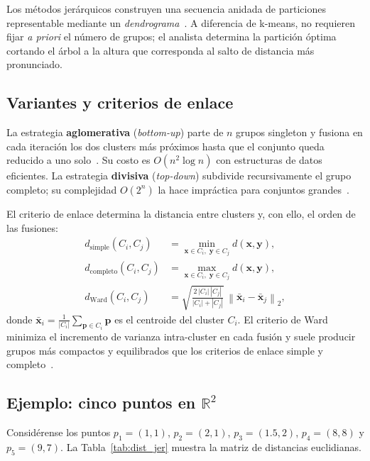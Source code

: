 Los métodos jerárquicos construyen una secuencia anidada de particiones representable mediante un \emph{dendrograma}~\cite{jain1999clustering}. A diferencia de k-means, no requieren fijar \textit{a priori} el número de grupos; el analista determina la partición óptima cortando el árbol a la altura que corresponda al salto de distancia más pronunciado.

\subsection{Variantes y criterios de enlace}

La estrategia \textbf{aglomerativa} (\textit{bottom-up}) parte de $n$ grupos singleton y fusiona en cada iteración los dos clusters más próximos hasta que el conjunto queda reducido a uno solo~\cite{murtagh2012hierarchical}. Su costo es $O(n^2 \log n)$ con estructuras de datos eficientes. La estrategia \textbf{divisiva} (\textit{top-down}) subdivide recursivamente el grupo completo; su complejidad $O(2^n)$ la hace impráctica para conjuntos grandes~\cite{jain1999clustering}.

El criterio de enlace determina la distancia entre clusters y, con ello, el orden de las fusiones:
\begin{align}
d_{\mathrm{simple}}(C_i, C_j) &= \min_{\mathbf{x}\in C_i,\;\mathbf{y}\in C_j} d(\mathbf{x},\mathbf{y}), \label{eq:single_link}\\
d_{\mathrm{completo}}(C_i, C_j) &= \max_{\mathbf{x}\in C_i,\;\mathbf{y}\in C_j} d(\mathbf{x},\mathbf{y}), \label{eq:complete_link}\\
d_{\mathrm{Ward}}(C_i, C_j) &= \sqrt{\frac{2\,|C_i|\,|C_j|}{|C_i|+|C_j|}}\,\left\|\bar{\mathbf{x}}_i - \bar{\mathbf{x}}_j\right\|_2, \label{eq:ward_link}
\end{align}
donde $\bar{\mathbf{x}}_i = \frac{1}{|C_i|}\sum_{\mathbf{p}\in C_i}\mathbf{p}$ es el centroide del cluster $C_i$. El criterio de Ward~\cite{ward1963hierarchical} minimiza el incremento de varianza intra-cluster en cada fusión y suele producir grupos más compactos y equilibrados que los criterios de enlace simple y completo~\cite{murtagh2012hierarchical}.

\subsection{Ejemplo: cinco puntos en $\mathbb{R}^2$}

Considérense los puntos $p_1=(1,1)$, $p_2=(2,1)$, $p_3=(1.5,2)$, $p_4=(8,8)$ y $p_5=(9,7)$. La Tabla~\ref{tab:dist_jer} muestra la matriz de distancias euclidianas.

